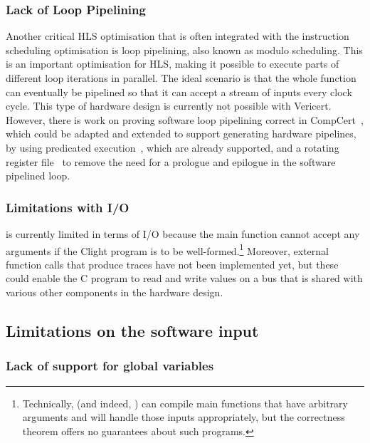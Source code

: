 \subsubsection{Lack of Loop Pipelining}

Another critical \gls{HLS} optimisation that is often integrated with the
instruction scheduling optimisation is loop pipelining, also known as modulo
scheduling.  This is an important optimisation for \gls{HLS}, making it possible
to execute parts of different loop iterations in parallel.  The ideal scenario
is that the whole function can eventually be pipelined so that it can accept a
stream of inputs every clock cycle.  This type of hardware design is currently
not possible with Vericert.  However, there is work on proving software loop
pipelining correct in CompCert~\cite{tristan10_simpl_verif_valid_softw_pipel},
which could be adapted and extended to support generating hardware pipelines, by
using predicated execution~\cite{rau92_code_gener_schem_sched_loops}, which are
already supported, and a rotating register
file~\cite{rau92_regis_alloc_softw_pipel_loops} to remove the need for a
prologue and epilogue in the software pipelined loop.

\subsubsection{Limitations with I/O}

\vericert{} is currently limited in terms of I/O because the main function
cannot accept any arguments if the \gls{Clight} program is to be
well-formed.\footnote{Technically, \vericert{} (and indeed, \compcert{}) can
  compile main functions that have arbitrary arguments and will handle those
  inputs appropriately, but the correctness theorem offers no guarantees about
  such programs.} Moreover, external function calls that produce traces have not
been implemented yet, but these could enable the C program to read and write
values on a bus that is shared with various other components in the hardware
design.

\subsection{Limitations on the software input}

\subsubsection{Lack of support for global variables}

